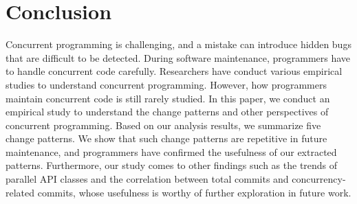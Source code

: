 \section{Conclusion}
\label{sec:conclude}
Concurrent programming is challenging, and a mistake can introduce hidden bugs that are difficult to be detected. During software maintenance, programmers have to handle concurrent code carefully. Researchers have conduct various empirical studies to understand concurrent programming. However, how programmers maintain concurrent code is still rarely studied. In this paper, we conduct an empirical study to understand the change patterns and other perspectives of concurrent programming. Based on our analysis results, we summarize five change patterns. We show that such change patterns are repetitive in future maintenance, and programmers have confirmed the usefulness of our extracted patterns. Furthermore, our study comes to other findings such as the trends of parallel API classes and the correlation between total commits and concurrency-related commits, whose usefulness is worthy of further exploration in future work. 
